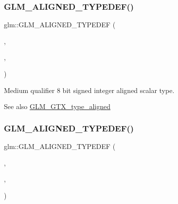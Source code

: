 \subsubsection{\texorpdfstring{G\+L\+M\+\_\+\+A\+L\+I\+G\+N\+E\+D\+\_\+\+T\+Y\+P\+E\+D\+E\+F()}{GLM\_ALIGNED\_TYPEDEF()}\hspace{0.1cm}{\footnotesize\ttfamily [21/209]}}
{\footnotesize\ttfamily glm\+::\+G\+L\+M\+\_\+\+A\+L\+I\+G\+N\+E\+D\+\_\+\+T\+Y\+P\+E\+D\+EF (\begin{DoxyParamCaption}\item[{\mbox{\hyperlink{group__gtc__type__precision_ga28a8b5fd51072680bb55178c17cc7411}{mediump\+\_\+i8}}}]{,  }\item[{aligned\+\_\+mediump\+\_\+i8}]{,  }\item[{1}]{ }\end{DoxyParamCaption})}

Medium qualifier 8 bit signed integer aligned scalar type. \begin{DoxySeeAlso}{See also}
\mbox{\hyperlink{group__gtx__type__aligned}{G\+L\+M\+\_\+\+G\+T\+X\+\_\+type\+\_\+aligned}} 
\end{DoxySeeAlso}
\mbox{\label{group__gtx__type__aligned_ga4b35ca5fe8f55c9d2fe54fdb8d8896f4}} 
\subsubsection{\texorpdfstring{G\+L\+M\+\_\+\+A\+L\+I\+G\+N\+E\+D\+\_\+\+T\+Y\+P\+E\+D\+E\+F()}{GLM\_ALIGNED\_TYPEDEF()}\hspace{0.1cm}{\footnotesize\ttfamily [22/209]}}
{\footnotesize\ttfamily glm\+::\+G\+L\+M\+\_\+\+A\+L\+I\+G\+N\+E\+D\+\_\+\+T\+Y\+P\+E\+D\+EF (\begin{DoxyParamCaption}\item[{\mbox{\hyperlink{group__gtc__type__precision_ga8454fc6a82c7bb787d0ac9663e08f63d}{mediump\+\_\+i16}}}]{,  }\item[{aligned\+\_\+mediump\+\_\+i16}]{,  }\item[{2}]{ }\end{DoxyParamCaption})}


